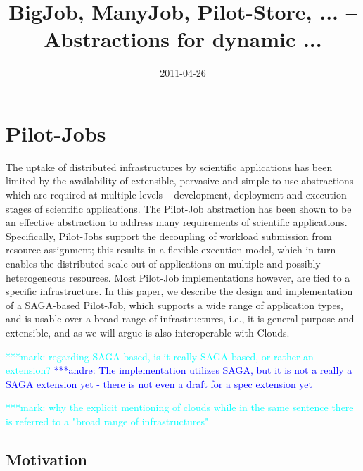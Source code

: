 \documentclass[]{article}
\title{BigJob, ManyJob, Pilot-Store, ... -- Abstractions for dynamic ...}
\author{  }
\date{2011-04-26}
\newcommand{\alnote}[1]{ {\textcolor{blue} { ***andre: #1 }}}
\newcommand{\msnote}[1]{ {\textcolor{cyan} { ***mark: #1 }}}
\newcommand{\alnote}[1]{}
\begin{document}
\ifpdf
{}
\else
{}
\fi

\maketitle


\section{Pilot-Jobs}

The uptake of distributed infrastructures by scientific applications has been
limited by the availability of extensible, pervasive and simple-to-use
abstractions which are required at multiple levels – development, deployment
and execution stages of scientific applications. The Pilot-Job abstraction has
been shown to be an effective abstraction to address many requirements of
scientific applications. Specifically, Pilot-Jobs support the decoupling of
workload submission from resource assignment; this results in a flexible
execution model, which in turn enables the distributed scale-out of
applications on multiple and possibly heterogeneous resources. Most Pilot-Job
implementations however, are tied to a specific infrastructure. In this paper,
we describe the design and implementation of a SAGA-based Pilot-Job, which
supports a wide range of application types, and is usable over a broad range
of infrastructures, i.e., it is general-purpose and extensible, and as we will
argue is also interoperable with Clouds.

\msnote{regarding SAGA-based, is it really SAGA based, or rather an 
extension?}\alnote{The implementation utilizes SAGA, but it is not a really a 
SAGA extension yet - there is not even a draft for a spec extension yet}

\msnote{why the explicit mentioning of clouds while in the same sentence there is referred to a "broad range of infrastructures"}

\subsection{Motivation}
\end{document}
